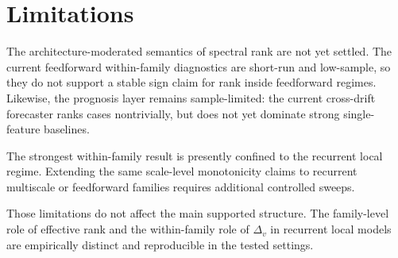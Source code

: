 \section{Limitations}

The architecture-moderated semantics of spectral rank are not yet settled. The
current feedforward within-family diagnostics are short-run and low-sample, so
they do not support a stable sign claim for rank inside feedforward regimes.
Likewise, the prognosis layer remains sample-limited: the current cross-drift
forecaster ranks cases nontrivially, but does not yet dominate strong single-
feature baselines.

The strongest within-family result is presently confined to the recurrent local
regime. Extending the same scale-level monotonicity claims to recurrent
multiscale or feedforward families requires additional controlled sweeps.

Those limitations do not affect the main supported structure. The family-level
role of effective rank and the within-family role of $\Delta_v$ in recurrent
local models are empirically distinct and reproducible in the tested settings.
